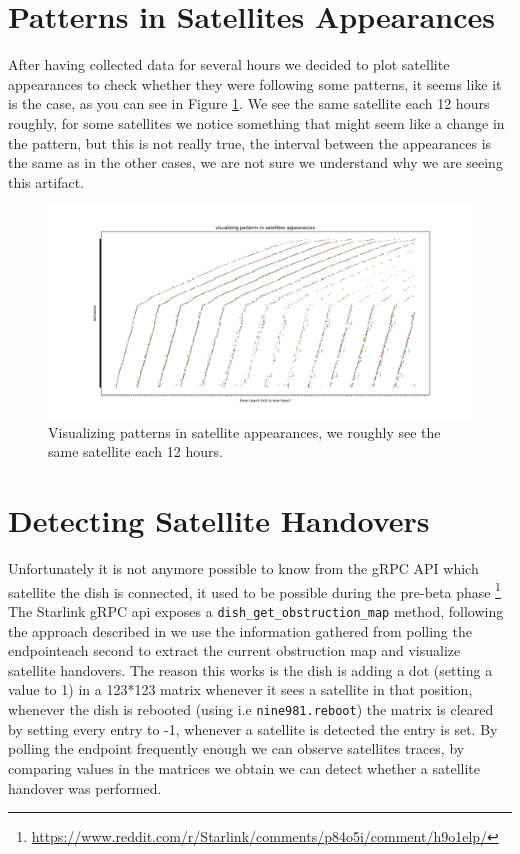 \documentclass[IN,11pt,twoside,openright,bachelor,english]{tumthesis}
\begin{document}
\section{Patterns in Satellites Appearances}
After having collected data for several hours we decided to plot satellite appearances to check whether they were following some patterns, it seems like it is the case, as you can see in Figure \ref{fig:vis-sat-pat}. We see the same satellite each 12 hours roughly, for some satellites we notice something that might seem like a change in the pattern, but this is not really true, the interval between the appearances is the same as in the other cases, we are not sure we understand why we are seeing this artifact.

\begin{figure}
	\centering
	\includegraphics[width=1.2\columnwidth]{img/visualizing-how-long-satellites-are-visible-for.png}
	\caption{Visualizing patterns in satellite appearances, we roughly see the same satellite each 12 hours.}
	\label{fig:vis-sat-pat}
\end{figure}

\section{Detecting Satellite Handovers}

Unfortunately it is not anymore possible to know from the gRPC API which satellite the dish is connected, it used to be possible during the pre-beta phase \footnote{\url{https://www.reddit.com/r/Starlink/comments/p84o5i/comment/h9o1elp/}}
The Starlink gRPC api exposes a \texttt{dish\_get\_obstruction\_map} method, following the approach described in \cite{izhikevich2023democratizing} we use the information gathered from polling the endpointeach second to extract the current obstruction map and visualize satellite handovers. The reason this works is the dish is adding a dot (setting a value to 1) in a 123*123 matrix whenever it sees a satellite in that position, whenever the dish is rebooted (using i.e \texttt{nine981.reboot}) the matrix is cleared by setting every entry to -1, whenever a satellite is detected the entry is set. By polling the endpoint frequently enough we can observe satellites traces, by comparing values in the matrices we obtain we can detect whether a satellite handover was performed.
\end{document}
